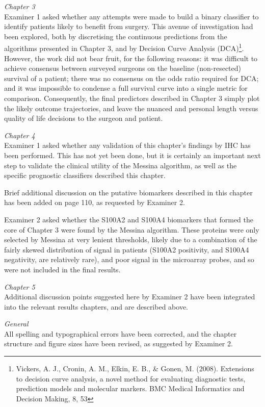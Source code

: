 \documentclass[a4paper,12pt,stdletter,sigleft]{newlfm}
\begin{document}
\begin{newlfm}
\emph{Chapter 3} \\
Examiner 1 asked whether any attempts were made to build a binary classifier to identify patients likely to benefit from surgery.  This avenue of investigation had been explored, both by discretising the continuous predictions from the algorithms presented in Chapter 3, and by Decision Curve Analysis (DCA)\footnote{Vickers, A. J., Cronin, A. M., Elkin, E. B., \& Gonen, M. (2008). Extensions to decision curve analysis, a novel method for evaluating diagnostic tests, prediction models and molecular markers. BMC Medical Informatics and Decision Making, 8, 53}.  However, the work did not bear fruit, for the following reasons: it was difficult to achieve consensus between surveyed surgeons on the baseline (non-resected) survival of a patient; there was no consensus on the odds ratio required for DCA; and it was impossible to condense a full survival curve into a single metric for comparison.  Consequently, the final predictors described in Chapter 3 simply plot the likely outcome trajectories, and leave the nuanced and personal length versus quality of life decisions to the surgeon and patient.

\emph{Chapter 4} \\
Examiner 1 asked whether any validation of this chapter's findings by IHC has been performed.  This has not yet been done, but it is certainly an important next step to validate the clinical utility of the Messina algorithm, as well as the specific prognostic classifiers described this chapter.

Brief additional discussion on the putative biomarkers described in this chapter has been added on page 110, as requested by Examiner 2.

Examiner 2 asked whether the S100A2 and S100A4 biomarkers that formed the core of Chapter 3 were found by the Messina algorithm.  These proteins were only selected by Messina at very lenient thresholds, likely due to a combination of the fairly skewed distribution of signal in patients (S100A2 positivity, and S100A4 negativity, are relatively rare), and poor signal in the microarray probes, and so were not included in the final results.

\emph{Chapter 5} \\
Additional discussion points suggested here by Examiner 2 have been integrated into the relevant results chapters, and are described above.

\emph{General} \\
All spelling and typographical errors have been corrected, and the chapter structure and figure sizes have been revised, as suggested by Examiner 2.


\end{newlfm}
\end{document}
